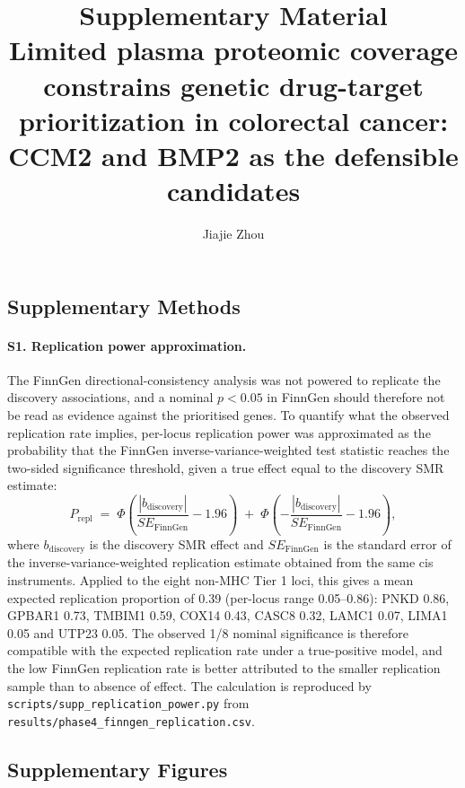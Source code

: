 \documentclass[11pt,a4paper]{article}
\title{Supplementary Material\\[0.4em]
\large Limited plasma proteomic coverage constrains genetic drug-target prioritization in colorectal cancer: CCM2 and BMP2 as the defensible candidates}
\author{Jiajie Zhou}
\date{}
\begin{document}
\maketitle

\setcounter{figure}{0}
\renewcommand{\thefigure}{S\arabic{figure}}
\renewcommand{\figurename}{Supplementary Figure}
\subsection*{Supplementary Methods}

\paragraph{S1. Replication power approximation.}
The FinnGen directional-consistency analysis was not powered to replicate the
discovery associations, and a nominal $p<0.05$ in FinnGen should therefore not be
read as evidence against the prioritised genes. To quantify what the observed
replication rate implies, per-locus replication power was approximated as the
probability that the FinnGen inverse-variance-weighted test statistic reaches the
two-sided significance threshold, given a true effect equal to the discovery SMR
estimate:
\[
P_{\mathrm{repl}} \;=\; \Phi\!\left(\frac{|b_{\mathrm{discovery}}|}{SE_{\mathrm{FinnGen}}}-1.96\right)
\;+\; \Phi\!\left(-\frac{|b_{\mathrm{discovery}}|}{SE_{\mathrm{FinnGen}}}-1.96\right),
\]
where $b_{\mathrm{discovery}}$ is the discovery SMR effect and $SE_{\mathrm{FinnGen}}$
is the standard error of the inverse-variance-weighted replication estimate obtained
from the same cis instruments. Applied to the eight non-MHC Tier 1 loci, this gives a
mean expected replication proportion of 0.39 (per-locus range 0.05--0.86): PNKD 0.86,
GPBAR1 0.73, TMBIM1 0.59, COX14 0.43, CASC8 0.32, LAMC1 0.07, LIMA1 0.05 and
UTP23 0.05. The observed 1/8 nominal significance is therefore compatible with the
expected replication rate under a true-positive model, and the low FinnGen replication
rate is better attributed to the smaller replication sample than to absence of effect.
The calculation is reproduced by \texttt{scripts/supp\_replication\_power.py} from
\texttt{results/phase4\_finngen\_replication.csv}.

\subsection*{Supplementary Figures}
\end{document}
